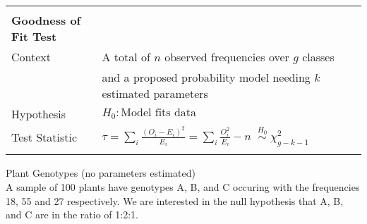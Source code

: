 \documentclass[bigtut]{tutorial}\usepackage[]{graphicx}\usepackage[]{color}
\begin{document}

\begin{tutorial}

\begin{center}
\begin{tabular}{| ll |} \hline
& \\
{\bf Goodness of Fit Test} & \\
Context & A total of $n$ observed frequencies over $g$ classes \\
& and a proposed probability model needing $k$ estimated parameters \\
Hypothesis &   $H_{0}: \mbox{Model fits data}$   \\
Test Statistic & $\tau = \sum_{i}  \frac{  (O_i - E_i)^2  } {  E_i }  =   \sum_{i}  \frac{  O_i^2  } {  E_i }  -n   \; \; 
\overset{H_0}{\sim} \; \chi^2_{g-k-1}$      \\ 
& \\  \hline
\end{tabular}
\end{center}


\begin{questions}

\vspace{.5cm}
\question Plant Genotypes (no parameters estimated) \\

 A sample of 100 plants have genotypes A, B, and C occuring with the frequencies 18, 55 and 27 respectively.
We are interested in the null hypothesis that A, B, and C are in the ratio of 1:2:1. \\

\end{questions}
\end{tutorial}
\end{document}

